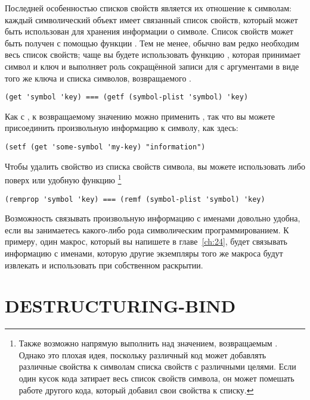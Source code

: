 Последней особенностью списков свойств является их отношение к символам: каждый
символический объект имеет связанный список свойств, который может быть использован для
хранения информации о символе. Список свойств может быть получен с помощью функции
. Тем не менее, обычно вам редко необходим весь список свойств; чаще вы
будете использовать функцию , которая принимает символ и ключ и выполняет роль
сокращённой записи для  с аргументами в виде того же ключа и списка символов,
возвращаемого .

\begin{lstlisting}[style=lisprepl]
  (get 'symbol 'key) === (getf (symbol-plist 'symbol) 'key)
\end{lstlisting}

Как с , к возвращаемому значению  можно применить , так
что вы можете присоединить произвольную информацию к символу, как здесь:

\begin{lstlisting}[style=lisprepl]
  (setf (get 'some-symbol 'my-key) "information")
\end{lstlisting}

Чтобы удалить свойство из списка свойств символа, вы можете использовать либо 
поверх  или удобную функцию  \footnote{Также возможно
  напрямую выполнить  над значением, возвращаемым . Однако
  это плохая идея, поскольку различный код может добавлять различные свойства к символам
  списка свойств с различными целями. Если один кусок кода затирает весь список свойств
  символа, он может помешать работе другого кода, который добавил свои свойства к списку.}

\begin{lstlisting}[style=lisprepl]
  (remprop 'symbol 'key) === (remf (symbol-plist 'symbol) 'key)
\end{lstlisting}

Возможность связывать произвольную информацию с именами довольно удобна, если вы
занимаетесь какого-либо рода символическим программированием. К примеру, один макрос,
который вы напишете в главе~\ref{ch:24}, будет связывать информацию с именами, которую
другие экземпляры того же макроса будут извлекать и использовать при собственном
раскрытии.

\section{DESTRUCTURING-BIND}

